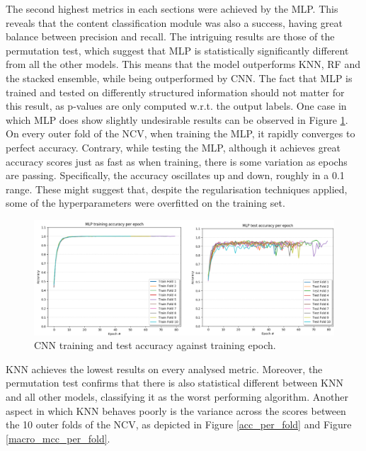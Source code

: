 The second highest metrics in each sections were achieved by the MLP. This reveals that the content classification module was also a success, having great balance between precision and recall. The intriguing results are those of the permutation test, which suggest that MLP is statistically significantly different from all the other models. This means that the model outperforms KNN, RF and the stacked ensemble, while being outperformed by CNN. The fact that MLP is trained and tested on differently structured information should not matter for this result, as p-values are only computed w.r.t. the output labels. One case in which MLP does show slightly undesirable results can be observed in Figure \ref{mlp_train_test}. On every outer fold of the NCV, when training the MLP, it rapidly converges to perfect accuracy. Contrary, while testing the MLP, although it achieves great accuracy scores just as fast as when training, there is some variation as epochs are passing. Specifically, the accuracy oscillates up and down, roughly in a 0.1 range. These might suggest that, despite the regularisation techniques applied, some of the hyperparameters were overfitted on the training set.\\

\begin{figure}[H]
  \centering
  \centerline{\includegraphics[scale=0.5]{Images/mlp_train_test.png}}
  \caption{CNN training and test accuracy against training epoch.}
  \label{mlp_train_test}
\end{figure}

KNN achieves the lowest results on every analysed metric. Moreover, the permutation test confirms that there is also statistical different between KNN and all other models, classifying it as the worst performing algorithm. Another aspect in which KNN behaves poorly is the variance across the scores between the 10 outer folds of the NCV, as depicted in Figure \ref{acc_per_fold} and Figure \ref{macro_mcc_per_fold}. \\

